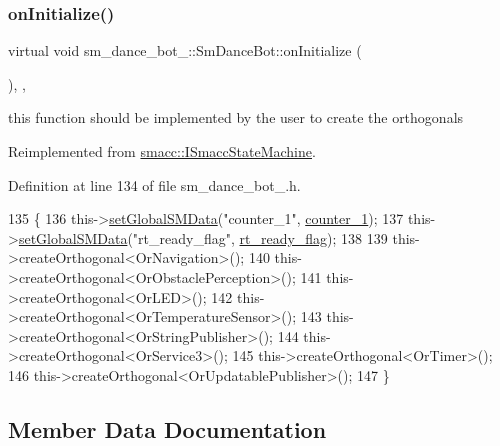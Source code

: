 \subsubsection{\texorpdfstring{on\+Initialize()}{onInitialize()}}
{\footnotesize\ttfamily virtual void sm\+\_\+dance\+\_\+bot\+\_\+::\+Sm\+Dance\+Bot\+::on\+Initialize (\begin{DoxyParamCaption}{ }\end{DoxyParamCaption})\hspace{0.3cm}{\ttfamily [inline]}, {\ttfamily [override]}, {\ttfamily [virtual]}}



this function should be implemented by the user to create the orthogonals 



Reimplemented from \hyperlink{classsmacc_1_1ISmaccStateMachine_ac2982c6c8283663e5e1e8a7c82f511ec}{smacc\+::\+I\+Smacc\+State\+Machine}.



Definition at line 134 of file sm\+\_\+dance\+\_\+bot\+\_.\+h.


\begin{DoxyCode}
135     \{
136         this->\hyperlink{classsmacc_1_1ISmaccStateMachine_a8588f9e580fbb95b53e2bd2ca3ff1f98}{setGlobalSMData}(\textcolor{stringliteral}{"counter\_1"}, \hyperlink{structsm__dance__bot__2_1_1SmDanceBot_a35b55719b3e4a8d62e9beffc8d2b1308}{counter\_1});
137         this->\hyperlink{classsmacc_1_1ISmaccStateMachine_a8588f9e580fbb95b53e2bd2ca3ff1f98}{setGlobalSMData}(\textcolor{stringliteral}{"rt\_ready\_flag"}, \hyperlink{structsm__dance__bot__2_1_1SmDanceBot_a9929548acc196867c0c368cdd778ea76}{rt\_ready\_flag});
138 
139         this->createOrthogonal<OrNavigation>();
140         this->createOrthogonal<OrObstaclePerception>();
141         this->createOrthogonal<OrLED>();
142         this->createOrthogonal<OrTemperatureSensor>();
143         this->createOrthogonal<OrStringPublisher>();
144         this->createOrthogonal<OrService3>();
145         this->createOrthogonal<OrTimer>();
146         this->createOrthogonal<OrUpdatablePublisher>();
147     \}
\end{DoxyCode}


\subsection{Member Data Documentation}
\mbox{\label{structsm__dance__bot__2_1_1SmDanceBot_a35b55719b3e4a8d62e9beffc8d2b1308}} 
